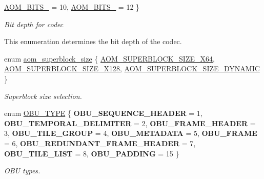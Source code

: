 \begin{DoxyCompactItemize}
\hyperlink{group__codec_gga6ed0e98eba4651c1ad845e39498e4153a91734384f432233c3d681052122ab8e7}{A\+O\+M\+\_\+\+B\+I\+T\+S\+\_} = 10, 
\hyperlink{group__codec_gga6ed0e98eba4651c1ad845e39498e4153a15836a87f9e9940885d5ef59a52bf728}{A\+O\+M\+\_\+\+B\+I\+T\+S\+\_} = 12
 \}\begin{DoxyCompactList}\small\item\em Bit depth for codec
\begin{DoxyItemize}
\item This enumeration determines the bit depth of the codec. 
\end{DoxyItemize}\end{DoxyCompactList}
\item 
enum \hyperlink{group__codec_gac34a24f7c6c0fef7518aed0da4425f61}{aom\+\_\+superblock\+\_\+size} \{ \hyperlink{group__codec_ggac34a24f7c6c0fef7518aed0da4425f61a5abd24080a18d4f7e33217d93a73e968}{A\+O\+M\+\_\+\+S\+U\+P\+E\+R\+B\+L\+O\+C\+K\+\_\+\+S\+I\+Z\+E\+\_\+X64}, 
\hyperlink{group__codec_ggac34a24f7c6c0fef7518aed0da4425f61a17127133dafcd42b1d792770981d67d0}{A\+O\+M\+\_\+\+S\+U\+P\+E\+R\+B\+L\+O\+C\+K\+\_\+\+S\+I\+Z\+E\+\_\+X128}, 
\hyperlink{group__codec_ggac34a24f7c6c0fef7518aed0da4425f61aaabb4d9ad771b2fa177ff6fb5437b179}{A\+O\+M\+\_\+\+S\+U\+P\+E\+R\+B\+L\+O\+C\+K\+\_\+\+S\+I\+Z\+E\+\_\+\+D\+Y\+N\+A\+M\+IC}
 \}\begin{DoxyCompactList}\small\item\em Superblock size selection. \end{DoxyCompactList}
\item 
\mbox{\label{group__codec_ga8671b36010adf45694a1c0868333c5b6}} 
enum \hyperlink{group__codec_ga8671b36010adf45694a1c0868333c5b6}{O\+B\+U\+\_\+\+T\+Y\+PE} \{ \newline
{\bfseries O\+B\+U\+\_\+\+S\+E\+Q\+U\+E\+N\+C\+E\+\_\+\+H\+E\+A\+D\+ER} = 1, 
{\bfseries O\+B\+U\+\_\+\+T\+E\+M\+P\+O\+R\+A\+L\+\_\+\+D\+E\+L\+I\+M\+I\+T\+ER} = 2, 
{\bfseries O\+B\+U\+\_\+\+F\+R\+A\+M\+E\+\_\+\+H\+E\+A\+D\+ER} = 3, 
{\bfseries O\+B\+U\+\_\+\+T\+I\+L\+E\+\_\+\+G\+R\+O\+UP} = 4, 
\newline
{\bfseries O\+B\+U\+\_\+\+M\+E\+T\+A\+D\+A\+TA} = 5, 
{\bfseries O\+B\+U\+\_\+\+F\+R\+A\+ME} = 6, 
{\bfseries O\+B\+U\+\_\+\+R\+E\+D\+U\+N\+D\+A\+N\+T\+\_\+\+F\+R\+A\+M\+E\+\_\+\+H\+E\+A\+D\+ER} = 7, 
{\bfseries O\+B\+U\+\_\+\+T\+I\+L\+E\+\_\+\+L\+I\+ST} = 8, 
\newline
{\bfseries O\+B\+U\+\_\+\+P\+A\+D\+D\+I\+NG} = 15
 \}\begin{DoxyCompactList}\small\item\em O\+BU types. \end{DoxyCompactList}

\end{DoxyCompactItemize}
